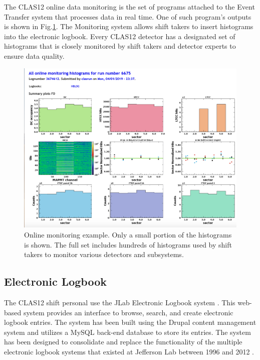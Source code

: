 The CLAS12 online data monitoring is the set of programs attached to the Event Transfer system that processes data in real time. One of such program's outputs is shown in Fig.\ref{fig:online_monitor}. The Monitoring system allows shift takers to insert histograms into the electronic logbook. Every CLAS12 detector has a designated set of histograms that is closely monitored by shift takers and detector experts to ensure data quality.

\begin{figure}[hbt]
	\centering
	\includegraphics[width=1.0\columnwidth,keepaspectratio]{img/online_monitor.png}
	\caption{Online monitoring example. Only a small portion of the histograms is shown. The full set includes hundreds of histograms used by shift takers to monitor various detectors and subsystems.}
	\label{fig:online_monitor}
\end{figure}

\subsection{Electronic Logbook}

The CLAS12 shift personal use the JLab Electronic Logbook system \cite{logbook-ref}. This web-based system provides an interface to browse, search, and create electronic logbook entries. The system has been built using the Drupal content management system and utilizes a MySQL back-end database to store its entries. The system has been designed to consolidate and replace the functionality of the multiple electronic logbook systems that existed at Jefferson Lab between 1996 and 2012 .

